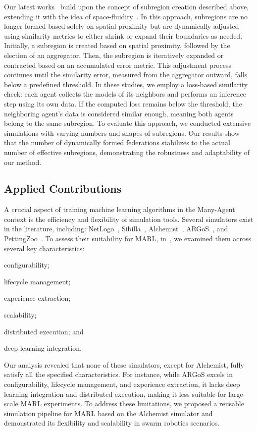 \documentclass[12pt]{article}
\begin{document}
Our latest works~\cite{DBLP:journals/corr/abs-2407-12410,DBLP:journals/iot/DominiAFVE2025} build upon the concept of subregion 
 creation described above, extending it with the idea of space-fluidity~\cite{DBLP:journals/lmcs/CasadeiMPVZ23}. 
% 
In this approach, subregions are no longer formed based solely on spatial proximity but are dynamically adjusted using 
 similarity metrics to either shrink or expand their boundaries as needed.
%
Initially, a subregion is created based on spatial proximity, followed by the election of an aggregator. 
%
Then, the subregion is iteratively expanded or contracted based on an accumulated error metric. 
%
This adjustment process continues until the similarity error, measured from the aggregator outward, 
 falls below a predefined threshold.
%
In these studies, we employ a loss-based similarity check: each agent collects the models of its neighbors and performs an inference 
 step using its own data. 
% 
If the computed loss remains below the threshold, the neighboring agent's data is considered similar enough, meaning both agents belong 
 to the same subregion.
%
To evaluate this approach, we conducted extensive simulations with varying numbers and shapes of subregions. 
%
Our results show that the number of dynamically formed federations stabilizes to the actual number of effective subregions, 
 demonstrating the robustness and adaptability of our method.

\subsection{Applied Contributions}

A crucial aspect of training machine learning algorithms in the Many-Agent context is the efficiency and flexibility of simulation tools. 
%
Several simulators exist in the literature, including: NetLogo~\cite{tisue2004netlogo}, Sibilla~\cite{DBLP:journals/scp/GiudiceMQRL24}, 
 Alchemist~\cite{Pianini_2013}, ARGoS~\cite{DBLP:journals/swarm/PinciroliTOPBBMFCDBGD12}, 
 and PettingZoo~\cite{DBLP:conf/nips/TerryBGJHSSDHPW21}. 
% 
To assess their suitability for MARL, in~\cite{DBLP:conf/dsrt/DominiAPV24},  we examined them across several key characteristics: 
\begin{enumerate*}[label=(\roman*)]
	\item configurability;
	\item lifecycle management; 
	\item experience extraction;
	\item scalability;
	\item distributed execution; and
	\item deep learning integration.
 \end{enumerate*}
%
Our analysis revealed that none of these simulators, except for Alchemist, fully satisfy all the specified characteristics. 
%
For instance, while ARGoS excels in configurability, lifecycle management, and experience extraction, 
 it lacks deep learning integration and distributed execution, making it less suitable for large-scale MARL experiments.
%
To address these limitations, we proposed a reusable simulation pipeline for MARL based on the Alchemist simulator and 
 demonstrated its flexibility and scalability in swarm robotics scenarios.
\end{document}
